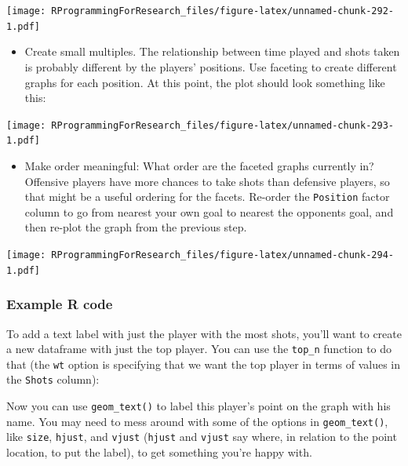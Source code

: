 \documentclass[]{book}
\makeatletter
\newenvironment{Shaded}{\begin{snugshade}}{\end{snugshade}}
\newcommand{\KeywordTok}[1]{\textcolor[rgb]{0.13,0.29,0.53}{\textbf{#1}}}
\newcommand{\DataTypeTok}[1]{\textcolor[rgb]{0.13,0.29,0.53}{#1}}
\newcommand{\DecValTok}[1]{\textcolor[rgb]{0.00,0.00,0.81}{#1}}
\newcommand{\StringTok}[1]{\textcolor[rgb]{0.31,0.60,0.02}{#1}}
\newcommand{\OperatorTok}[1]{\textcolor[rgb]{0.81,0.36,0.00}{\textbf{#1}}}
\newcommand{\NormalTok}[1]{#1}
\providecommand{\tightlist}{%
  \setlength{\itemsep}{0pt}\setlength{\parskip}{0pt}}
\newenvironment{kframe}{%
\medskip{}
\setlength{\fboxsep}{.8em}
 \def\at@end@of@kframe{}%
 \ifinner\ifhmode%
  \def\at@end@of@kframe{\end{minipage}}%
  \begin{minipage}{\columnwidth}%
 \fi\fi%
 \def\FrameCommand##1{\hskip\@totalleftmargin \hskip-\fboxsep
 \colorbox{shadecolor}{##1}\hskip-\fboxsep
     \hskip-\linewidth \hskip-\@totalleftmargin \hskip\columnwidth}%
 \MakeFramed {\advance\hsize-\width
   \@totalleftmargin\z@ \linewidth\hsize
   \@setminipage}}%
 {\par\unskip\endMakeFramed%
 \at@end@of@kframe}
\renewenvironment{Shaded}{\begin{kframe}}{\end{kframe}}
\theoremstyle{definition}
\theoremstyle{definition}
\theoremstyle{definition}
\theoremstyle{remark}
\makeatother
\begin{document}
\texttt{[image: RProgrammingForResearch\_files/figure-latex/unnamed-chunk-292-1.pdf]}

\begin{itemize}
\tightlist
\item
  Create small multiples. The relationship between time played and shots
  taken is probably different by the players' positions. Use faceting to
  create different graphs for each position. At this point, the plot
  should look something like this:
\end{itemize}

\texttt{[image: RProgrammingForResearch\_files/figure-latex/unnamed-chunk-293-1.pdf]}

\begin{itemize}
\tightlist
\item
  Make order meaningful: What order are the faceted graphs currently in?
  Offensive players have more chances to take shots than defensive
  players, so that might be a useful ordering for the facets. Re-order
  the \texttt{Position} factor column to go from nearest your own goal
  to nearest the opponents goal, and then re-plot the graph from the
  previous step.
\end{itemize}

\texttt{[image: RProgrammingForResearch\_files/figure-latex/unnamed-chunk-294-1.pdf]}

\subsubsection{Example R code}\label{example-r-code-8}

To add a text label with just the player with the most shots, you'll
want to create a new dataframe with just the top player. You can use the
\texttt{top\_n} function to do that (the \texttt{wt} option is
specifying that we want the top player in terms of values in the
\texttt{Shots} column):

\begin{Shaded}
\end{Shaded}

Now you can use \texttt{geom\_text()} to label this player's point on
the graph with his name. You may need to mess around with some of the
options in \texttt{geom\_text()}, like \texttt{size}, \texttt{hjust},
and \texttt{vjust} (\texttt{hjust} and \texttt{vjust} say where, in
relation to the point location, to put the label), to get something
you're happy with.
\end{document}
